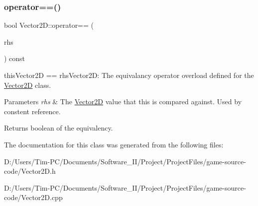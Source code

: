 \subsubsection{\texorpdfstring{operator==()}{operator==()}}
{\footnotesize\ttfamily bool Vector2\+D\+::operator== (\begin{DoxyParamCaption}\item[{const \hyperlink{class_vector2_d}{Vector2D} \&}]{rhs }\end{DoxyParamCaption}) const}



this\+Vector2D == rhs\+Vector2D\+: The equivalancy operator overload defined for the \hyperlink{class_vector2_d}{Vector2D} class. 


\begin{DoxyParams}{Parameters}
{\em rhs} & The \hyperlink{class_vector2_d}{Vector2D} value that this is compared against. Used by constent reference. \\
\hline
\end{DoxyParams}
\begin{DoxyReturn}{Returns}
boolean of the equivalency. 
\end{DoxyReturn}


The documentation for this class was generated from the following files\+:\begin{DoxyCompactItemize}
\item 
D\+:/\+Users/\+Tim-\/\+P\+C/\+Documents/\+Software\+\_\+\+I\+I/\+Project/\+Project\+Files/game-\/source-\/code/Vector2\+D.\+h\item 
D\+:/\+Users/\+Tim-\/\+P\+C/\+Documents/\+Software\+\_\+\+I\+I/\+Project/\+Project\+Files/game-\/source-\/code/Vector2\+D.\+cpp\end{DoxyCompactItemize}
